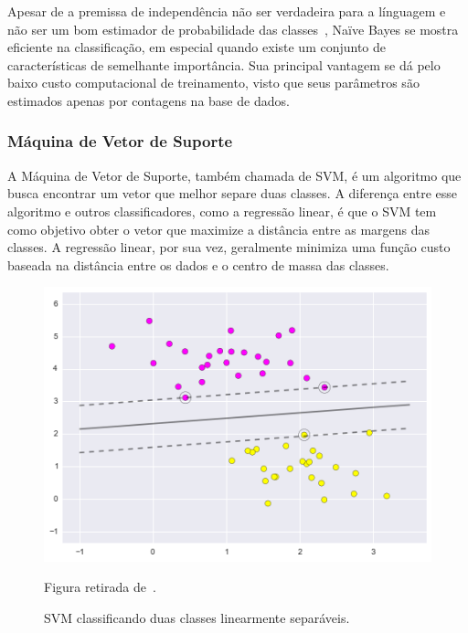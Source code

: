Apesar de a premissa de independência não ser verdadeira para a línguagem e não
ser um bom estimador de probabilidade das classes~\cite{schutze08}, Naïve Bayes se
mostra eficiente na classificação, em especial quando existe um conjunto de
características de semelhante importância.
Sua principal vantagem se dá pelo baixo custo computacional de treinamento, visto
que seus parâmetros são estimados apenas por contagens na base de dados.

\subsubsection{Máquina de Vetor de Suporte}
\label{sec:svm}

A Máquina de Vetor de Suporte, também chamada de SVM, é um algoritmo que busca
encontrar um vetor que melhor separe duas classes.
A diferença entre esse algoritmo e outros classificadores, como a regressão
linear, é que o SVM tem como objetivo obter o vetor que maximize a distância entre
as margens das classes.
A regressão linear, por sua vez, geralmente minimiza uma função custo baseada na
distância entre os dados e o centro de massa das classes.

\begin{figure}
\begin{center} {
    \begin{center}
    \includegraphics[scale=0.6]{images/svm.png}
    \caption{SVM classificando duas classes linearmente separáveis.}
    \small Figura retirada de~\cite{vanderplas15}.
    \label{fig:svm}
    \end{center}
}
\end{center}
\end{figure}

